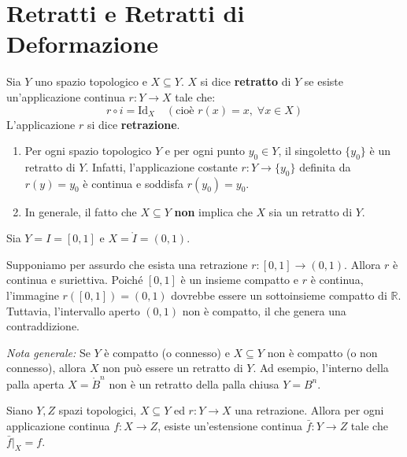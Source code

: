 \vspace{1.5em}

\section{Retratti e Retratti di Deformazione}

\begin{definicion}
Sia $Y$ uno spazio topologico e $X \subseteq Y$. $X$ si dice \textbf{retratto} di $Y$ se esiste un'applicazione continua $r: Y \to X$ tale che:
\[
r \circ i = \mathrm{Id}_X \quad (\text{cioè } r(x) = x, \; \forall x \in X)
\]
L'applicazione $r$ si dice \textbf{retrazione}.
\end{definicion}


\begin{ejemplo}
\begin{enumerate}
    \item Per ogni spazio topologico $Y$ e per ogni punto $y_0 \in Y$, il singoletto $\{y_0\}$ è un retratto di $Y$.
    Infatti, l'applicazione costante $r: Y \to \{y_0\}$ definita da $r(y) = y_0$ è continua e soddisfa $r(y_0) = y_0$.

    \item In generale, il fatto che $X \subseteq Y$ \textbf{non} implica che $X$ sia un retratto di $Y$.
\end{enumerate}
\end{ejemplo}

\begin{ejemplo}[Controesempio]
Sia $Y = I = [0,1]$ e $X = \mathring{I} = (0,1)$.

Supponiamo per assurdo che esista una retrazione $r: [0,1] \to (0,1)$. Allora $r$ è continua e suriettiva. Poiché $[0,1]$ è un insieme compatto e $r$ è continua, l'immagine $r([0,1]) = (0,1)$ dovrebbe essere un sottoinsieme compatto di $\mathbb{R}$. Tuttavia, l'intervallo aperto $(0,1)$ non è compatto, il che genera una contraddizione.

\textit{Nota generale:} Se $Y$ è compatto (o connesso) e $X \subseteq Y$ non è compatto (o non connesso), allora $X$ non può essere un retratto di $Y$. Ad esempio, l'interno della palla aperta $X = \mathring{B}^n$ non è un retratto della palla chiusa $Y = B^n$.
\end{ejemplo}

\begin{prop}
Siano $Y, Z$ spazi topologici, $X \subseteq Y$ ed $r: Y \to X$ una retrazione. Allora per ogni applicazione continua $f: X \to Z$, esiste un'estensione continua $\bar{f}: Y \to Z$ tale che $\bar{f}\vert_X = f$.
\end{prop}

